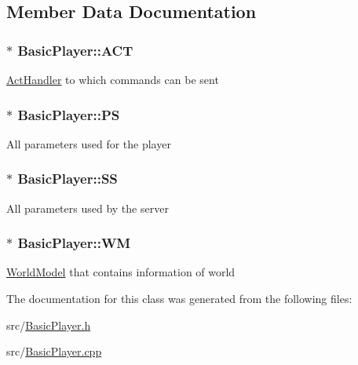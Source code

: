 \subsection{Member Data Documentation}
\subsubsection[{\texorpdfstring{A\+CT}{ACT}}]{$\ast$ Basic\+Player\+::\+A\+CT\hspace{0.3cm}{\ttfamily [protected]}}\hypertarget{classBasicPlayer_adb559ebfe52c2ca1b01cc21655bbed10}{}\label{classBasicPlayer_adb559ebfe52c2ca1b01cc21655bbed10}
\hyperlink{classActHandler}{Act\+Handler} to which commands can be sent 
\subsubsection[{\texorpdfstring{PS}{PS}}]{$\ast$ Basic\+Player\+::\+PS\hspace{0.3cm}{\ttfamily [protected]}}\hypertarget{classBasicPlayer_aef9a4fafd096a406d0ef5f85d11907b8}{}\label{classBasicPlayer_aef9a4fafd096a406d0ef5f85d11907b8}
All parameters used for the player 
\subsubsection[{\texorpdfstring{SS}{SS}}]{$\ast$ Basic\+Player\+::\+SS\hspace{0.3cm}{\ttfamily [protected]}}\hypertarget{classBasicPlayer_a16daddc5f23e5862d115d1913a93fc1d}{}\label{classBasicPlayer_a16daddc5f23e5862d115d1913a93fc1d}
All parameters used by the server 
\subsubsection[{\texorpdfstring{WM}{WM}}]{$\ast$ Basic\+Player\+::\+WM\hspace{0.3cm}{\ttfamily [protected]}}\hypertarget{classBasicPlayer_a0a0a8b87ce4d8b6ad94a0fe594274715}{}\label{classBasicPlayer_a0a0a8b87ce4d8b6ad94a0fe594274715}
\hyperlink{classWorldModel}{World\+Model} that contains information of world 

The documentation for this class was generated from the following files\+:\begin{DoxyCompactItemize}
\item 
src/\hyperlink{BasicPlayer_8h}{Basic\+Player.\+h}\item 
src/\hyperlink{BasicPlayer_8cpp}{Basic\+Player.\+cpp}\end{DoxyCompactItemize}
